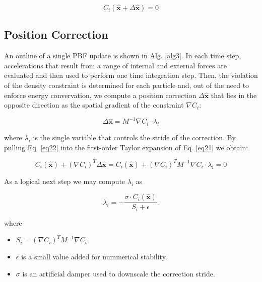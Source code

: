 \documentclass[
	11pt, 
	DIV10,
	ngerman,
	a4paper, 
	oneside, 
	headings=normal, 
	captions=tableheading,
	final, 
	numbers=noenddot
]{scrartcl}
\begin{document}
\begin{equation}
	\label{eq21}
	C_{i}(\hat{\boldsymbol{x}} + \Delta \hat{\boldsymbol{x}}) = 0
\end{equation}

\subsection{Position Correction}

An outline of a single PBF update is shown in Alg. \ref{alg3}. In each time step, accelerations that result from a range of internal and external forces are evaluated and then used to perform one time integration step. Then, the violation of the density constraint is determined for each particle and, out of the need to enforce energy convervation, we compute a position correction $ \Delta \hat{\boldsymbol{x}} $ that lies in the opposite direction as the spatial gradient of the constraint $ \nabla C_{i} $:

\begin{equation}
	\label{eq22}
	\Delta \hat{\boldsymbol{x}} = M^{-1} \nabla C_{i} \cdot \lambda_{i}
\end{equation}

where $ \lambda_{i} $ is the single variable that controls the stride of the correction. By pulling Eq. \eqref{eq22} into the first-order Taylor expansion of Eq. \eqref{eq21} we obtain:

\begin{equation}
	\label{eq23}
	C_{i}(\hat{\boldsymbol{x}}) + (\nabla C_{i})^{T} \Delta \hat{\boldsymbol{x}} = C_{i}(\hat{\boldsymbol{x}}) + (\nabla C_{i})^{T} M^{-1} \nabla C_{i} \cdot \lambda_{i} = 0
\end{equation}

As a logical next step we may compute $ \lambda_{i} $ as

\begin{equation}
	\label{eq24}
	\lambda_{i} = - \frac{\sigma \cdot C_{i}(\hat{\boldsymbol{x}})}{S_{i} + \epsilon}.
\end{equation}

where

\begin{itemize}
    \item $ S_{i} = (\nabla C_{i})^{T} M^{-1} \nabla C_{i} $.
    \item $ \epsilon $ is a small value added for nummerical stability.
    \item $ \sigma $ is an artificial damper used to downscale the correction stride.
\end{itemize}
\end{document}
